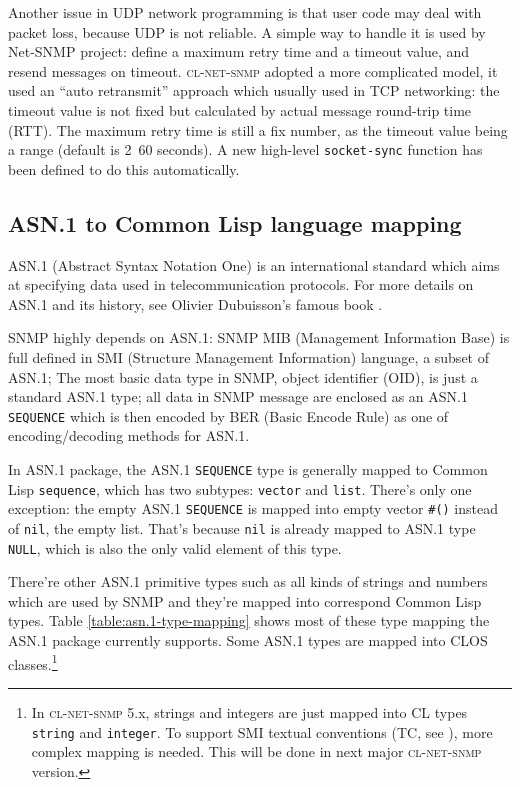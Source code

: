\documentclass[reprint,natbib,9pt]{sigplanconf}
\begin{document}
Another issue in UDP network programming is that user code may deal
with packet loss, because UDP is not reliable. A simple way to handle
it is used by Net-SNMP project: define a maximum retry time
and a timeout value, and resend messages on timeout. \textsc{cl-net-snmp}
adopted a more complicated model, it used an ``auto retransmit''
approach \cite{Jacobson:RTT} which usually used in TCP networking: the
timeout value is not fixed but calculated by actual message round-trip
time (RTT). The maximum retry time is still a fix number, as the
timeout value being a range (default is 2~60 seconds). A new
high-level \texttt{socket-sync} function has been defined to do this
automatically.

\subsection{ASN.1 to Common Lisp language mapping}

ASN.1 (Abstract Syntax Notation One) \cite{ISO:ASN.1} is an
international standard which aims at specifying data used in
telecommunication protocols. For more details on ASN.1 and its
history, see Olivier Dubuisson's famous book \cite{Book:ASN.1}.

SNMP highly depends on ASN.1: SNMP MIB (Management Information Base)
\cite{RFC:3418} is full defined in SMI (Structure Management Information)
language, a subset of ASN.1; The most basic data type in SNMP, object identifier (OID),
is just a standard ASN.1 type; all data in SNMP message are enclosed as an ASN.1 \texttt{SEQUENCE} which is then
encoded by BER (Basic Encode Rule) as one of
encoding/decoding methods for ASN.1.

In ASN.1 package, the ASN.1 \texttt{SEQUENCE} type is generally mapped
to Common Lisp \texttt{sequence}, which has two subtypes: \texttt{vector}
and \texttt{list}.
There's only one exception: the empty ASN.1 \texttt{SEQUENCE} is
mapped into empty vector \texttt{\#()} instead of \texttt{nil}, the empty
list. That's because \texttt{nil} is already mapped to ASN.1 type \texttt{NULL},
which is also the only valid element of this type.

There're other ASN.1 primitive types such as all kinds of strings and numbers
which are used by SNMP and they're mapped into correspond Common Lisp types.
Table \ref{table:asn.1-type-mapping} shows most of these type mapping
the ASN.1 package currently supports. Some ASN.1 types are mapped
into CLOS classes.\footnote{In \textsc{cl-net-snmp} 5.x, strings and integers
are just mapped into CL types \texttt{string} and \texttt{integer}. To support
SMI textual conventions (TC, see \cite{RFC:2579}), more complex mapping is needed.
This will be done in next major \textsc{cl-net-snmp} version.}
\end{document}
